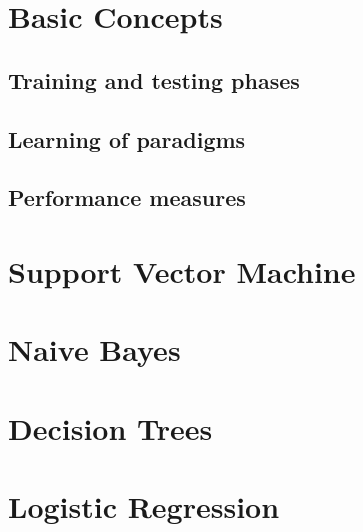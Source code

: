 \section{Basic Concepts}
  \subsection{Training and testing phases}
  \subsection{Learning of paradigms}
  \subsection{Performance measures}

\section{Support Vector Machine}

\section{Naive Bayes}

\section{Decision Trees}

\section{Logistic Regression}

